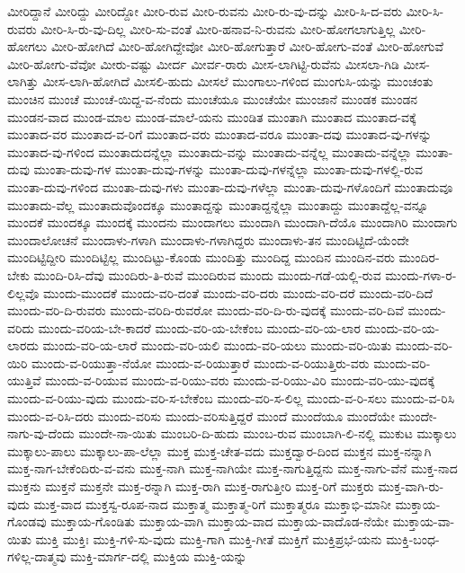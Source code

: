 {ಮೀರಿದ್ದಾನೆ
ಮೀರಿದ್ದು
ಮೀರಿದ್ದೋ
ಮೀರಿ-ರುವ
ಮೀರಿ-ರುವನು
ಮೀರಿ-ರು-ವು-ದನ್ನು
ಮೀರಿ-ಸಿ-ದ-ವರು
ಮೀರಿ-ಸಿ-ರುವರು
ಮೀರಿ-ಸಿ-ರು-ವು-ದಿಲ್ಲ
ಮೀರಿ-ಸು-ವಂತೆ
ಮೀರಿ-ಹನಾವ-ನಿ-ರುವನು
ಮೀರಿ-ಹೋಗಲಾಗುತ್ತಿಲ್ಲ
ಮೀರಿ-ಹೋಗಲು
ಮೀರಿ-ಹೋಗಿದೆ
ಮೀರಿ-ಹೋಗಿದ್ದೇವೋ
ಮೀರಿ-ಹೋಗುತ್ತಾರೆ
ಮೀರಿ-ಹೋಗು-ವಂತೆ
ಮೀರಿ-ಹೋಗುವೆ
ಮೀರಿ-ಹೋಗು-ವೆವೋ
ಮೀರು-ವಷ್ಟು
ಮೀರ್ದ
ಮೀರ್ವ-ರಾರು
ಮೀಸ-ಲಾಗಿಟ್ಟಿ-ರುವೆನು
ಮೀಸಲಾ-ಗಿಡಿ
ಮೀಸ-ಲಾಗಿತ್ತು
ಮೀಸ-ಲಾಗಿ-ಹೋಗಿದೆ
ಮೀಸಲಿ-ಹುದು
ಮೀಸಲೆ
ಮುಂಗಾಲು-ಗಳಿಂದ
ಮುಂಗುಸಿ-ಯನ್ನು
ಮುಂಚಂತು
ಮುಂಚಿನ
ಮುಂಚೆ
ಮುಂಚೆ-ಯಿದ್ದ-ವ-ನೆಂದು
ಮುಂಚೆಯೂ
ಮುಂಚೆಯೇ
ಮುಂಜಾನೆ
ಮುಂಡಕ
ಮುಂಡನ
ಮುಂಡನ-ವಾದ
ಮುಂಡ-ಮಾಲ
ಮುಂಡ-ಮಾಲೆ-ಯನು
ಮುಂಡಿತ
ಮುಂತಾಗಿ
ಮುಂತಾದ
ಮುಂತಾದ-ವಕ್ಕೆ
ಮುಂತಾದ-ವರ
ಮುಂತಾದ-ವ-ರಿಗೆ
ಮುಂತಾದ-ವರು
ಮುಂತಾದ-ವರೂ
ಮುಂತಾ-ದವು
ಮುಂತಾದ-ವು-ಗಳನ್ನು
ಮುಂತಾದ-ವು-ಗಳಿಂದ
ಮುಂತಾದುದನ್ನೆಲ್ಲಾ
ಮುಂತಾದು-ವನ್ನು
ಮುಂತಾದು-ವನ್ನೆಲ್ಲ
ಮುಂತಾದು-ವನ್ನೆಲ್ಲಾ
ಮುಂತಾ-ದುವು
ಮುಂತಾ-ದುವು-ಗಳ
ಮುಂತಾ-ದುವು-ಗಳನ್ನು
ಮುಂತಾ-ದುವು-ಗಳನ್ನೆಲ್ಲಾ
ಮುಂತಾ-ದುವು-ಗಳಲ್ಲಿ-ರುವ
ಮುಂತಾ-ದುವು-ಗಳಿಂದ
ಮುಂತಾ-ದುವು-ಗಳು
ಮುಂತಾ-ದುವು-ಗಳೆಲ್ಲಾ
ಮುಂತಾ-ದುವು-ಗಳೊಂದಿಗೆ
ಮುಂತಾದುವೂ
ಮುಂತಾದು-ವೆಲ್ಲ
ಮುಂತಾದುವೊಂದಕ್ಕೂ
ಮುಂತಾದ್ದನ್ನು
ಮುಂತಾದ್ದನ್ನೆಲ್ಲಾ
ಮುಂತಾದ್ದು
ಮುಂತಾದ್ದೆಲ್ಲ-ವನ್ನೂ
ಮುಂದಕೆ
ಮುಂದಕ್ಕೂ
ಮುಂದಕ್ಕೆ
ಮುಂದನು
ಮುಂದಾಗಲು
ಮುಂದಾಗಿ
ಮುಂದಾಗಿ-ದೆಯೊ
ಮುಂದಾಗಿರಿ
ಮುಂದಾಗು
ಮುಂದಾಲೋಚನೆ
ಮುಂದಾಳು-ಗಳಾಗಿ
ಮುಂದಾಳು-ಗಳಾಗಿದ್ದರು
ಮುಂದಾಳು-ತನ
ಮುಂದಿಟ್ಟಿದೆ-ಯೆಂದೇ
ಮುಂದಿಟ್ಟಿದ್ದೀರಿ
ಮುಂದಿಟ್ಟಿಲ್ಲ
ಮುಂದಿಟ್ಟು-ಕೊಂಡು
ಮುಂದಿತ್ತು
ಮುಂದಿದ್ದ
ಮುಂದಿನ
ಮುಂದಿನ-ವರು
ಮುಂದಿರ-ಬೇಕು
ಮುಂದಿ-ರಿಸಿ-ದೆವು
ಮುಂದಿರು-ತಿ-ರುವೆ
ಮುಂದಿರುವ
ಮುಂದು
ಮುಂದು-ಗಡೆ-ಯಲ್ಲಿ-ರುವ
ಮುಂದು-ಗಳಾ-ರ-ಲಿಲ್ಲವೊ
ಮುಂದು-ಮುಂದಕೆ
ಮುಂದು-ವರಿ-ದಂತೆ
ಮುಂದು-ವರಿ-ದರು
ಮುಂದು-ವರಿ-ದರೆ
ಮುಂದು-ವರಿ-ದಿದೆ
ಮುಂದು-ವರಿ-ದಿ-ರುವರು
ಮುಂದು-ವರಿದಿ-ರುವರೋ
ಮುಂದು-ವರಿ-ದಿ-ರು-ವುದಕ್ಕೆ
ಮುಂದು-ವರಿ-ದಿವೆ
ಮುಂದು-ವರಿದು
ಮುಂದು-ವರಿಯ-ಬೇ-ಕಾದರೆ
ಮುಂದು-ವರಿ-ಯ-ಬೇಕೆಂಬ
ಮುಂದು-ವರಿ-ಯ-ಲಾರ
ಮುಂದು-ವರಿ-ಯ-ಲಾರದು
ಮುಂದು-ವರಿ-ಯ-ಲಾರೆ
ಮುಂದು-ವರಿ-ಯಲಿ
ಮುಂದು-ವರಿ-ಯಲು
ಮುಂದು-ವರಿ-ಯಿತು
ಮುಂದು-ವರಿ-ಯಿರಿ
ಮುಂದು-ವ-ರಿಯುತ್ತಾ-ನೆಯೋ
ಮುಂದು-ವ-ರಿಯುತ್ತಾರೆ
ಮುಂದು-ವ-ರಿಯುತ್ತಿರು-ವರು
ಮುಂದು-ವರಿ-ಯುತ್ತಿವೆ
ಮುಂದು-ವ-ರಿಯುವ
ಮುಂದು-ವ-ರಿಯು-ವರು
ಮುಂದು-ವ-ರಿಯು-ವಿರಿ
ಮುಂದು-ವರಿ-ಯು-ವುದಕ್ಕೆ
ಮುಂದು-ವ-ರಿಯು-ವುದು
ಮುಂದು-ವರಿ-ಸ-ಬೇಕೆಂಬ
ಮುಂದು-ವರಿ-ಸ-ಲಿಲ್ಲ
ಮುಂದು-ವ-ರಿ-ಸಲು
ಮುಂದು-ವ-ರಿಸಿ
ಮುಂದು-ವ-ರಿಸಿ-ದರು
ಮುಂದು-ವರಿಸು
ಮುಂದು-ವರಿಸುತ್ತಿದ್ದರೆ
ಮುಂದೆ
ಮುಂದೆಯೂ
ಮುಂದೆಯೇ
ಮುಂದೇ-ನಾಗು-ವು-ದೆಂದು
ಮುಂದೇ-ನಾ-ಯಿತು
ಮುಂಬರಿ-ದಿ-ಹುದು
ಮುಂಬ-ರುವ
ಮುಂಬಾಗಿ-ಲಿ-ನಲ್ಲಿ
ಮುಕುಟ
ಮುಕ್ಕಾಲು
ಮುಕ್ಕಾಲು-ಪಾಲು
ಮುಕ್ಕಾಲು-ಪಾ-ಲೆಲ್ಲಾ
ಮುಕ್ತ
ಮುಕ್ತ-ಚೇತ-ವದು
ಮುಕ್ತದ್ವಾರ-ದಿಂದ
ಮುಕ್ತನ
ಮುಕ್ತ-ನನ್ನಾಗಿ
ಮುಕ್ತ-ನಾಗ-ಬೇಕೆಂದಿರು-ವ-ವನು
ಮುಕ್ತ-ನಾಗಿ
ಮುಕ್ತ-ನಾಗಿಯೇ
ಮುಕ್ತ-ನಾಗುತ್ತಿದ್ದನು
ಮುಕ್ತ-ನಾಗು-ವೆನೆ
ಮುಕ್ತ-ನಾದ
ಮುಕ್ತನು
ಮುಕ್ತನೆ
ಮುಕ್ತನೇ
ಮುಕ್ತ-ರನ್ನಾಗಿ
ಮುಕ್ತ-ರಾಗಿ
ಮುಕ್ತ-ರಾಗುತ್ತೀರಿ
ಮುಕ್ತ-ರಿಗೆ
ಮುಕ್ತರು
ಮುಕ್ತ-ವಾಗಿ-ರು-ವುದು
ಮುಕ್ತ-ವಾದ
ಮುಕ್ತಸ್ವ-ರೂಪ-ನಾದ
ಮುಕ್ತಾತ್ಮ
ಮುಕ್ತಾತ್ಮ-ರಿಗೆ
ಮುಕ್ತಾತ್ಮರೂ
ಮುಕ್ತಾಭಿ-ಮಾನೀ
ಮುಕ್ತಾಯ-ಗೊಂಡವು
ಮುಕ್ತಾಯ-ಗೊಂಡಿತು
ಮುಕ್ತಾಯ-ವಾಗಿ
ಮುಕ್ತಾಯ-ವಾದ
ಮುಕ್ತಾಯ-ವಾದೊಡ-ನೆಯೇ
ಮುಕ್ತಾಯ-ವಾ-ಯಿತು
ಮುಕ್ತಿ
ಮುಕ್ತಿಃ
ಮುಕ್ತಿ-ಗಳಿ-ಸು-ವುದು
ಮುಕ್ತಿ-ಗಾಗಿ
ಮುಕ್ತಿ-ಗೀತೆ
ಮುಕ್ತಿಗೆ
ಮುಕ್ತಿಪ್ರಭೆ-ಯನು
ಮುಕ್ತಿ-ಬಂಧ-ಗಳಿಲ್ಲ-ದಾತ್ಮವು
ಮುಕ್ತಿ-ಮಾರ್ಗ-ದಲ್ಲಿ
ಮುಕ್ತಿಯ
ಮುಕ್ತಿ-ಯನ್ನು
}
